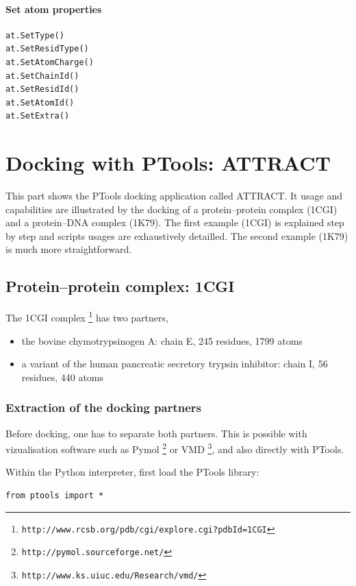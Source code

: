 \documentclass[12pt,a4paper]{article}
\begin{document}
\paragraph{Set atom properties}
\begin{verbatim}
at.SetType()
at.SetResidType()
at.SetAtomCharge()
at.SetChainId()
at.SetResidId()
at.SetAtomId()
at.SetExtra()
\end{verbatim}

\section{Docking with PTools: ATTRACT}

This part shows the PTools docking application called ATTRACT. It usage and 
capabilities are illustrated by the docking of a protein--protein complex (1CGI) 
and a protein--DNA complex (1K79). The first example (1CGI) is explained 
step by step and scripts usages are exhaustively detailled. The second example 
(1K79) is much more straightforward.

\subsection{Protein--protein complex: 1CGI}

The 1CGI complex \footnote{\tt http://www.rcsb.org/pdb/cgi/explore.cgi?pdbId=1CGI} 
has two partners,
\begin{itemize}
\item the bovine chymotrypsinogen A: chain E, 245 residues, 1799 atoms
\item a variant of the human pancreatic secretory trypsin inhibitor: chain I, 56 residues, 440 atoms
\end{itemize}

\subsubsection{Extraction of the docking partners}

Before docking, one has to separate both partners. This is possible with vizualisation
software such as Pymol \footnote{\tt http://pymol.sourceforge.net/} or VMD \footnote{\tt http://www.ks.uiuc.edu/Research/vmd/}, 
and also directly with PTools.

Within the Python interpreter, first load the PTools library:
\begin{verbatim}
from ptools import *
\end{verbatim}
\end{document}

